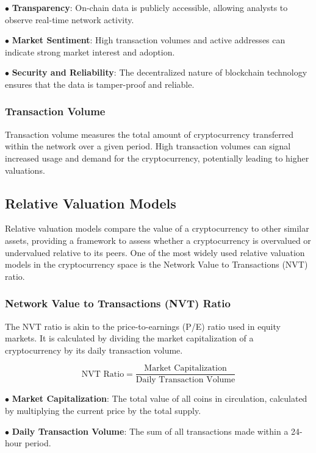 \documentclass{ledger}
\begin{document}
$ \bullet $ \textbf{Transparency}: On-chain data is publicly accessible, allowing analysts to observe real-time network activity.

$ \bullet $ \textbf{Market Sentiment}: High transaction volumes and active addresses can indicate strong market interest and adoption.

$ \bullet $ \textbf{Security and Reliability}: The decentralized nature of blockchain technology ensures that the data is tamper-proof and reliable.

\hfill \break

\subsubsection{Transaction Volume}

Transaction volume measures the total amount of cryptocurrency transferred within the network over a given period. High transaction volumes can signal increased usage and demand for the cryptocurrency, potentially leading to higher valuations.

\subsection{Relative Valuation Models}

Relative valuation models compare the value of a cryptocurrency to other similar assets, providing a framework to assess whether a cryptocurrency is overvalued or undervalued relative to its peers. One of the most widely used relative valuation models in the cryptocurrency space is the Network Value to Transactions (NVT) ratio.

\subsubsection{Network Value to Transactions (NVT) Ratio}

The NVT ratio is akin to the price-to-earnings (P/E) ratio used in equity markets. It is calculated by dividing the market capitalization of a cryptocurrency by its daily transaction volume.

\[
\text{NVT Ratio} = \frac{\text{Market Capitalization}}{\text{Daily Transaction Volume}}
\]

$ \bullet $ \textbf{Market Capitalization}: The total value of all coins in circulation, calculated by multiplying the current price by the total supply.

$ \bullet $  \textbf{Daily Transaction Volume}: The sum of all transactions made within a 24-hour period.
\end{document}
